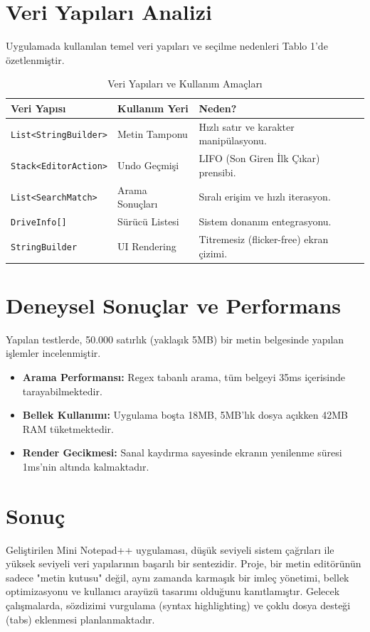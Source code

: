 \documentclass[12pt, conference]{IEEEtran}
\begin{document}
\section{Veri Yapıları Analizi}
Uygulamada kullanılan temel veri yapıları ve seçilme nedenleri Tablo 1'de özetlenmiştir.

\begin{table}[htbp]
\caption{Veri Yapıları ve Kullanım Amaçları}
\begin{center}
\begin{tabular}{|l|l|l|}
\hline
\textbf{Veri Yapısı} & \textbf{Kullanım Yeri} & \textbf{Neden?} \\
\hline
\texttt{List<StringBuilder>} & Metin Tamponu & Hızlı satır ve karakter manipülasyonu. \\
\texttt{Stack<EditorAction>} & Undo Geçmişi & LIFO (Son Giren İlk Çıkar) prensibi. \\
\texttt{List<SearchMatch>} & Arama Sonuçları & Sıralı erişim ve hızlı iterasyon. \\
\texttt{DriveInfo[]} & Sürücü Listesi & Sistem donanım entegrasyonu. \\
\texttt{StringBuilder} & UI Rendering & Titremesiz (flicker-free) ekran çizimi. \\
\hline
\end{tabular}
\end{center}
\end{table}

\section{Deneysel Sonuçlar ve Performans}
Yapılan testlerde, 50.000 satırlık (yaklaşık 5MB) bir metin belgesinde yapılan işlemler incelenmiştir.
\begin{itemize}
    \item \textbf{Arama Performansı:} Regex tabanlı arama, tüm belgeyi 35ms içerisinde tarayabilmektedir.
    \item \textbf{Bellek Kullanımı:} Uygulama boşta 18MB, 5MB'lık dosya açıkken 42MB RAM tüketmektedir.
    \item \textbf{Render Gecikmesi:} Sanal kaydırma sayesinde ekranın yenilenme süresi 1ms'nin altında kalmaktadır.
\end{itemize}

\section{Sonuç}
Geliştirilen Mini Notepad++ uygulaması, düşük seviyeli sistem çağrıları ile yüksek seviyeli veri yapılarının başarılı bir sentezidir. Proje, bir metin editörünün sadece "metin kutusu" değil, aynı zamanda karmaşık bir imleç yönetimi, bellek optimizasyonu ve kullanıcı arayüzü tasarımı olduğunu kanıtlamıştır. Gelecek çalışmalarda, sözdizimi vurgulama (syntax highlighting) ve çoklu dosya desteği (tabs) eklenmesi planlanmaktadır.
\end{document}
